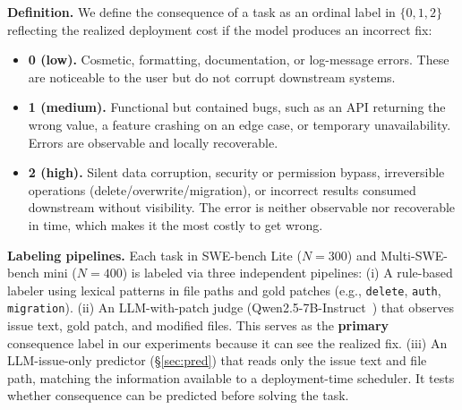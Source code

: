 \documentclass{article}
\begin{document}
\textbf{Definition.} We define the consequence of a task as an ordinal label in $\{0, 1, 2\}$ reflecting the realized deployment cost if the model produces an incorrect fix:
\begin{itemize}\itemsep0pt
  \item \textbf{0 (low).} Cosmetic, formatting, documentation, or log-message errors. These are noticeable to the user but do not corrupt downstream systems.
  \item \textbf{1 (medium).} Functional but contained bugs, such as an API returning the wrong value, a feature crashing on an edge case, or temporary unavailability. Errors are observable and locally recoverable.
  \item \textbf{2 (high).} Silent data corruption, security or permission bypass, irreversible operations (delete/overwrite/migration), or incorrect results consumed downstream without visibility. The error is neither observable nor recoverable in time, which makes it the most costly to get wrong.
\end{itemize}

\textbf{Labeling pipelines.} Each task in SWE-bench Lite ($N{=}300$) and Multi-SWE-bench mini ($N{=}400$) is labeled via three independent pipelines:
(i) A rule-based labeler using lexical patterns in file paths and gold patches (e.g., \texttt{delete}, \texttt{auth}, \texttt{migration}).
(ii) An LLM-with-patch judge (Qwen2.5-7B-Instruct~\citep{qwen2025qwen25}) that observes issue text, gold patch, and modified files. This serves as the \textbf{primary} consequence label in our experiments because it can see the realized fix.
(iii) An LLM-issue-only predictor (\S\ref{sec:pred}) that reads only the issue text and file path, matching the information available to a deployment-time scheduler. It tests whether consequence can be predicted before solving the task.
\end{document}
